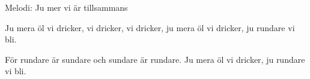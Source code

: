 \begin{song}

\begin{songmeta}
Melodi: Ju mer vi är tillsammans
\end{songmeta}

\begin{songtext}
Ju mera öl vi dricker,
vi dricker, vi dricker,
ju mera öl vi dricker,
ju rundare vi bli.

För rundare är sundare
och sundare är rundare.
Ju mera öl vi dricker,
ju rundare vi bli.
\end{songtext}
\end{song}

